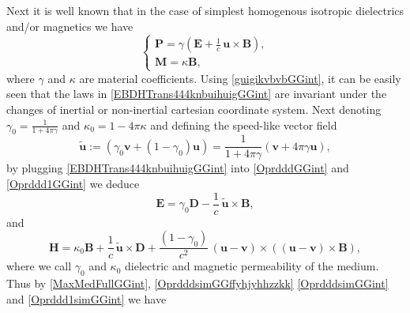 \documentclass{article}
\theoremstyle{definition}
\theoremstyle{remark}
\renewcommand{\vec}[1]{\mathbf{#1}}
\newcommand{\R}{\mathbb{R}}
\newcommand{\er}{\eqref}
\newcommand{\R}{{\mathbb{R}}}
\newcommand{\er}{\eqref}
\begin{document}
Next it is well known that in the case of simplest homogenous
isotropic dielectrics and/or magnetics we have
\begin{equation}\label{EBDHTrans444knbuihuigGGint}
\begin{cases}
\vec P=\gamma\left(\vec E+\frac{1}{c}\,\vec u\times \vec B\right),\\
\vec M=\kappa\vec B,
\end{cases}
\end{equation}
where $\gamma$ and $\kappa$ are material coefficients.
Using \er{guigikvbvbGGint}, it can be easily seen that the laws in
\er{EBDHTrans444knbuihuigGGint} are invariant under the changes of
inertial or non-inertial cartesian coordinate system. Next denoting
$\gamma_0=\frac{1}{1+4\pi\gamma}$ and $\kappa_0=1-4\pi \kappa$ and
defining the speed-like vector field
\begin{equation}\label{OprdddsimGGffyhjyhhzzkk}
\vec {\tilde u}:=\left(\gamma_0\vec v+(1-\gamma_0)\vec
u\right)=\frac{1}{1+4\pi\gamma}\left(\vec v+4\pi\gamma\vec u\right),
\end{equation}
by plugging \er{EBDHTrans444knbuihuigGGint} into \er{OprdddGGint}
and \er{Oprddd1GGint} we deduce
\begin{equation}\label{OprdddsimGGint}
\vec E=\gamma_0\vec D-\frac{1}{c}\,\vec {\tilde u}\times \vec B,
\end{equation}
and
\begin{equation}\label{Oprddd1simGGint}
\vec H=\kappa_0\vec B+\frac{1}{c}\,\vec {\tilde u}\times \vec
D+\frac{(1-\gamma_0)}{c^2}\,(\vec u-\vec v)\times\left(\left(\vec
u-\vec v\right)\times \vec B\right),
\end{equation}
where we call $\gamma_0$ and $\kappa_0$ dielectric and magnetic
permeability of the medium. Thus by \er{MaxMedFullGGint},
\er{OprdddsimGGffyhjyhhzzkk} \er{OprdddsimGGint} and
\er{Oprddd1simGGint} we have
\end{document}
